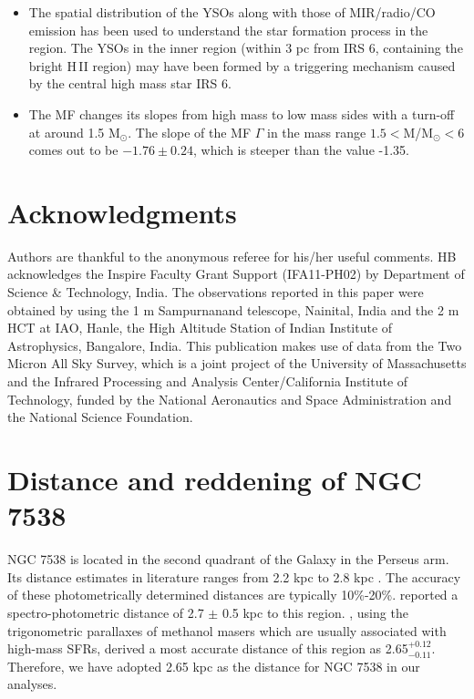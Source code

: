 \documentclass[a4paper,fleqn,usenatbib,useAMS]{mnras}
\begin{document}
\begin{itemize}
\item
The spatial distribution of the YSOs along with those of MIR/radio/CO emission has been used to understand the 
star formation process in the region.
The YSOs in the inner region (within 3 pc from IRS 6, containing the bright H\,{\sevensize II}  region) may have been formed by a triggering mechanism caused by the central high mass star IRS 6.

\item
The MF changes its slopes from high mass to low mass sides with a turn-off at around 1.5 M$_\odot$.
The slope of the MF $\Gamma$ in the mass range $1.5 <$M/M$_\odot < 6$ comes out to be $-1.76\pm0.24$, which is steeper than
the \citet{1955ApJ...121..161S} value -1.35.

\end{itemize}

\section*{Acknowledgments}

Authors are thankful to the anonymous referee for his/her useful comments.
HB acknowledges the Inspire Faculty Grant Support (IFA11-PH02) by Department of Science \& Technology, India.
The observations reported in this paper were obtained by using the 1 m Sampurnanand telescope, Nainital, India and  the 2 m HCT at IAO, Hanle, the High Altitude Station of Indian Institute of Astrophysics, Bangalore, India. This publication makes use of data from the Two Micron All Sky Survey, which is a joint project of the University of Massachusetts and the Infrared Processing and Analysis Center/California Institute of Technology, funded by the National Aeronautics and Space Administration and the National Science Foundation. 


{}



\appendix


\section{Distance and reddening of NGC 7538}

NGC 7538 is located in the second quadrant of the Galaxy in the Perseus arm.
Its distance estimates in literature ranges from 2.2 kpc \citep{1986A&A...161..130M} to 2.8 kpc \citep{1978A&A....66....1C}.
The accuracy of these photometrically determined distances are typically 10\%-20\%. 
\citet{2010A&A...517A...2P} reported a spectro-photometric distance of 2.7 $\pm$ 0.5 kpc to this region.
\citet{2009ApJ...693..406M}, using the trigonometric parallaxes of methanol masers
which are usually associated with high-mass SFRs,
derived a most accurate distance  of this region as 2.65$^{+0.12}_{-0.11}$.
Therefore, we have adopted 2.65 kpc as the distance for NGC 7538 in our analyses.
\end{document}
